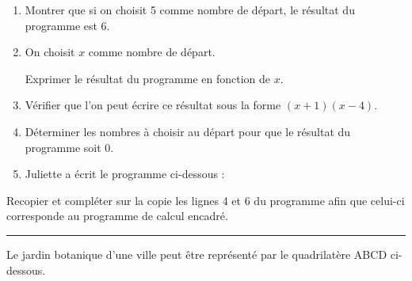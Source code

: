 \documentclass[a4paper,11pt]{article}
\newcommand{\exercice}[2]{%
  \vspace{0.8cm}%
  \noindent\rule{\textwidth}{0.4pt}%
  \vspace{0.4cm}\par%
  \noindent{\Large\bfseries Exercice #1\hspace{0.3em}{\normalfont\normalsize(#2 points)}}%
  \par\vspace{0.5cm}%
}
\begin{document}
\begin{enumerate}[itemsep=4pt]
  \item Montrer que si on choisit 5 comme nombre de départ, le résultat du programme est 6.
  \item On choisit $x$ comme nombre de départ.

  Exprimer le résultat du programme en fonction de $x$.
  \item Vérifier que l'on peut écrire ce résultat sous la forme $(x + 1)(x - 4)$.
  \item Déterminer les nombres à choisir au départ pour que le résultat du programme soit 0.
  \item Juliette a écrit le programme ci-dessous :

\begin{center}
\begin{scratch}
\end{scratch}
\end{center}
\end{enumerate}

\medskip

Recopier et compléter sur la copie les lignes 4 et 6 du programme afin que celui-ci corresponde au programme de calcul encadré.

\exercice{4}{7}

Le jardin botanique d'une ville peut être représenté par le quadrilatère ABCD ci-dessous.

\medskip
\end{document}
